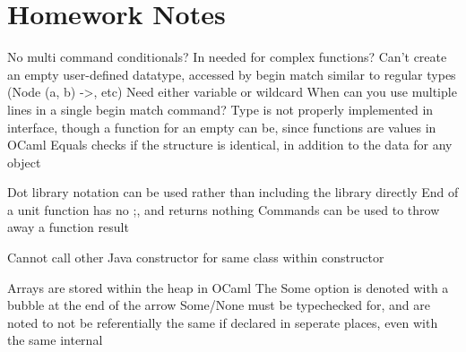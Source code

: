 \documentclass[11 pt, twoside]{article}
\newenvironment{outline*}
{
	\begin{outline}[enumerate]
	}
	{\end{outline}
}
\begin{document}
\section{Homework Notes}
\begin{outline*}
\1 No multi command conditionals?
\1 In needed for complex functions?
\1 Can't create an empty user-defined datatype, accessed by begin match similar to regular types (Node (a, b) ->, etc)
\1 Need either variable or wildcard
\1 When can you use multiple lines in a single begin match command?
\1 Type is not properly implemented in interface, though a function for an empty can be, since functions are values in OCaml
\1 Equals checks if the structure is identical, in addition to the data for any object

\1 Dot library notation can be used rather than including the library directly
\1 End of a unit function has no ;, and returns nothing
\1 Commands can be used to throw away a function result

\1 Cannot call other Java constructor for same class within constructor

\1 Arrays are stored within the heap in OCaml
	\2 The Some option is denoted with a bubble at the end of the arrow
	\2 Some/None must be typechecked for, and are noted to not be referentially the same if declared in seperate places, even with the same internal
\end{outline*}
\end{document}
